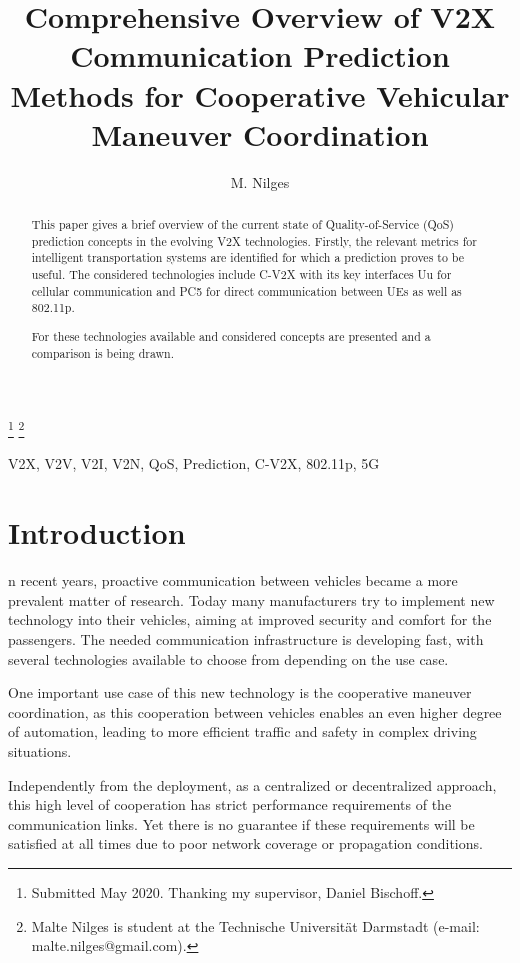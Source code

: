 \documentclass{IEEEtran}
\begin{document}
\title{Comprehensive Overview of V2X Communication Prediction Methods for
Cooperative Vehicular Maneuver Coordination}
\author{M. Nilges}
\thanks{Submitted May 2020. Thanking my supervisor, Daniel Bischoff.}
\thanks{Malte Nilges is student at the Technische Universität Darmstadt (e-mail: malte.nilges@gmail.com). }

\maketitle

\begin{abstract}
    This paper gives a brief overview of the current state of Quality-of-Service (QoS) prediction concepts in the evolving V2X technologies. Firstly, the relevant metrics for intelligent transportation systems are identified for which a prediction proves to be useful. The considered technologies include C-V2X with its key interfaces Uu for cellular communication and PC5 for direct communication between UEs as well as 802.11p.
    
    For these technologies available and considered concepts are presented and a comparison is being drawn.
\end{abstract}

\begin{IEEEkeywords}
V2X, V2V, V2I, V2N, QoS, Prediction, C-V2X, 802.11p, 5G
\end{IEEEkeywords}

\section{Introduction}
\label{sec:introduction}
n recent years, proactive communication between vehicles became a more prevalent matter of research. Today many manufacturers try to implement new technology into their vehicles, aiming at  improved security and comfort for the passengers. The needed communication infrastructure is developing fast, with several technologies available to choose from depending on the use case.

One important use case of this new technology is the cooperative maneuver coordination, as this cooperation between vehicles enables an even higher degree of automation, leading to more efficient traffic and safety in complex driving situations.

Independently from the deployment, as a centralized or decentralized approach, this high level of cooperation has strict performance requirements of the communication links. Yet there is no guarantee if these requirements will be satisfied at all times due to poor network coverage or propagation conditions.
\end{document}
